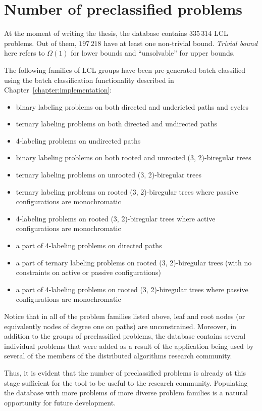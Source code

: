 \section{Number of preclassified problems}

At the moment of writing the thesis, the database contains $335\,314$
LCL problems. Out of them, $197\,218$ have at least one non-trivial bound. \emph{Trivial bound} here
refers to $\Omega(1)$ for lower bounds and ``unsolvable'' for upper bounds.

The following families of LCL groups have been pre-generated batch classified
using the batch classification functionality described in Chapter~\ref{chapter:implementation}:

\begin{itemize}
  \item binary labeling problems on both directed and undericted paths and cycles
  \item ternary labeling problems on both directed and undirected paths
  \item 4-labeling problems on undirected paths
  \item binary labeling problems on both rooted and unrooted (3, 2)-biregular trees
  \item ternary labeling problems on unrooted (3, 2)-biregular trees
  \item ternary labeling problems on rooted (3, 2)-biregular trees where passive configurations are monochromatic
  \item 4-labeling problems on rooted (3, 2)-biregular trees where active configurations are monochromatic
  \item a part of 4-labeling problems on directed paths
  \item a part of ternary labeling problems on rooted (3, 2)-biregular trees (with no constraints on active or passive configurations)
  \item a part of 4-labeling problems on rooted (3, 2)-biregular trees where passive configurations are monochromatic
\end{itemize}
Notice that in all of the problem families listed above, leaf and root nodes
(or equivalently nodes of degree one on paths) are unconstrained. Moreover, in addition to the
groups of preclassified problems, the database contains several individual problems that
were added as a result of the application being used by several of the members of the
distributed algorithms research community.

Thus, it is evident that the number of preclassified problems is already at this stage sufficient
for the tool to be useful to the research community. Populating the database
with more problems of more diverse problem families is a natural opportunity for future
development.


